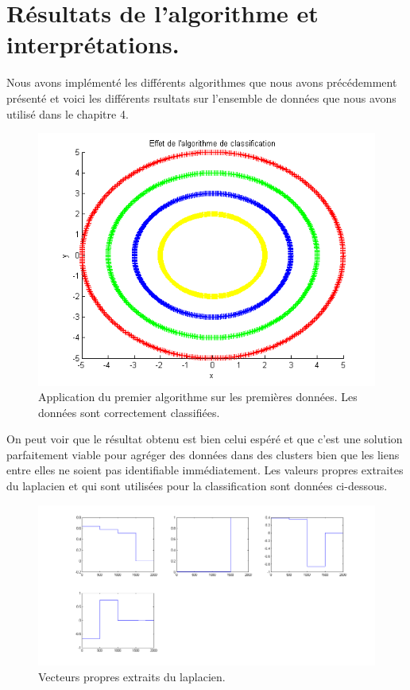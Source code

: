 \chapter{Résultats de l'algorithme et interprétations.}


Nous avons implémenté les différents algorithmes que nous avons précédemment présenté et voici les différents rsultats sur l'ensemble de données que nous avons utilisé dans le chapitre 4.

\begin{figure}[H]
\centering
    \includegraphics[scale=0.6,angle=0]{Images/AlgoClssification.png}
    \caption{Application du premier algorithme sur les premières données. Les données sont correctement classifiées.}
    \label{fig:AlgoClssification}
\end{figure}

On peut voir que le résultat obtenu est bien celui espéré et que c'est une solution parfaitement viable pour agréger des données dans des clusters bien que les liens entre elles ne soient pas identifiable immédiatement. Les valeurs propres extraites du laplacien et qui sont utilisées pour la classification sont données ci-dessous.

\begin{figure}[H]
\centering
    \includegraphics[scale=0.4,angle=0]{Images/VecteursPropres.png}
    \caption{Vecteurs propres extraits du laplacien.}
    \label{fig:VecteursPropres}
\end{figure}

